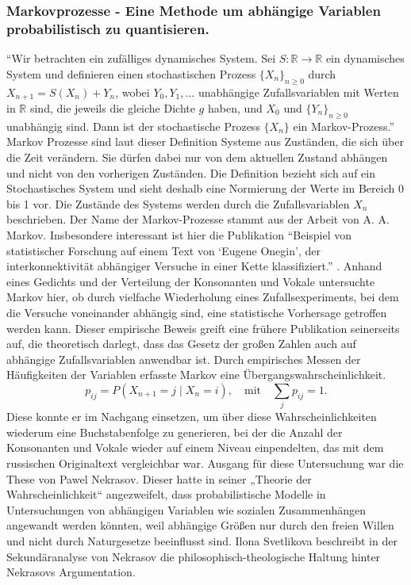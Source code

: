 \subsubsection{Markovprozesse - Eine Methode um abhängige Variablen probabilistisch zu quantisieren.}

\enquote{Wir betrachten ein zufälliges dynamisches System. Sei $S : \mathbb{R} \to \mathbb{R}$ ein dynamisches System und definieren einen stochastischen Prozess $\{X_n\}_{n \ge 0}$ durch $X_{n+1} = S(X_n) + Y_n$, wobei $Y_0, Y_1, \dots$ unabhängige Zufallsvariablen mit Werten in $\mathbb{R}$ sind, die jeweils die gleiche Dichte $g$ haben, und $X_0$ und $\{Y_n\}_{n \ge 0}$ unabhängig sind. Dann ist der stochastische Prozess $\{X_n\}$ ein Markov-Prozess.} \citep[S.~13]{KhalilGhaffari2023}
Markov Prozesse sind laut dieser Definition Systeme aus Zuständen, die sich über die Zeit verändern.
Sie dürfen dabei nur von dem aktuellen Zustand abhängen und nicht von den vorherigen Zuständen.
Die Definition bezieht sich auf ein Stochastisches System und sieht deshalb eine Normierung der Werte im Bereich 0 bis 1 vor.
Die Zustände des Systems werden durch die Zufallsvariablen $X_n$ beschrieben.
\newline
Der Name der Markov-Prozesse stammt aus der Arbeit von A. A. Markov. Insbesondere interessant ist hier die Publikation \enquote{Beispiel von statistischer Forschung auf einem Text von \enquote{Eugene Onegin}, der interkonnektivität abhängiger Versuche in einer Kette klassifiziert.} \citep{markov1913onegin}.
Anhand eines Gedichts und der Verteilung der Konsonanten und Vokale untersuchte Markov hier, ob durch vielfache Wiederholung eines Zufallsexperiments, bei dem die Versuche voneinander abhängig sind, eine statistische Vorhersage getroffen werden kann. Dieser empirische Beweis greift eine frühere Publikation seinerseits auf, die theoretisch darlegt, dass das Gesetz der großen Zahlen auch auf abhängige
Zufallsvariablen anwendbar ist. Durch empirisches Messen der Häufigkeiten der Variablen erfasste Markov eine Übergangswahrscheinlichkeit. 
\begin{equation}
p_{ij} = P(X_{n+1} = j \mid X_n = i),
\quad \text{mit} \quad \sum_j p_{ij} = 1.
\label{eq:transition_prob}
\end{equation}
Diese konnte er im Nachgang einsetzen, um über diese Wahrscheinlichkeiten wiederum eine Buchstabenfolge zu generieren, bei der die Anzahl der Konsonanten und Vokale wieder auf einem Niveau einpendelten, das mit dem russischen Originaltext vergleichbar war.
Ausgang für diese Untersuchung war die These von Pawel Nekrasov. Dieser hatte in seiner „Theorie der Wahrscheinlichkeit“ angezweifelt, dass probabilistische Modelle in Untersuchungen von abhängigen Variablen wie sozialen Zusammenhängen angewandt werden könnten, weil abhängige Größen nur durch den freien Willen und nicht durch Naturgesetze beeinflusst sind. Ilona Svetlikova beschreibt in der Sekundäranalyse von Nekrasov die philosophisch-theologische Haltung hinter Nekrasovs Argumentation.
